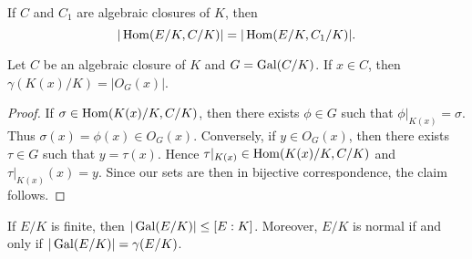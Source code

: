 \begin{exercise}
\label{xca:gamma_C}
    If $C$ and $C_1$ are algebraic closures of $K$, then
    \[
    |\operatorname{Hom}(E/K,C/K)|=|\operatorname{Hom}(E/K,C_1/K)|.
    \]
\end{exercise}

\begin{proposition}
\label{pro:gamma_orbit}
    Let $C$ be an algebraic closure of $K$ and $G=\operatorname{Gal}(C/K)$. 
    If $x\in C$, then $\gamma(K(x)/K)=|O_G(x)|$. 
\end{proposition}

\begin{proof}
    If $\sigma\in\operatorname{Hom}(K(x)/K,C/K)$, then there exists $\phi\in G$ such that
    $\phi|_{K(x)}=\sigma$. Thus $\sigma(x)=\phi(x)\in O_G(x)$. Conversely,
    if $y\in O_G(x)$, then there exists $\tau\in G$ such that
    $y=\tau(x)$. Hence $\tau|_{K(x)}\in\operatorname{Hom}(K(x)/K,C/K)$ and 
    $\tau|_{K(x)}(x)=y$. Since our sets are then in bijective correspondence, 
    the claim follows. 
\end{proof}


\begin{exercise}
If $E/K$ is finite, then $|\operatorname{Gal}(E/K)|\leq [E:K]$. Moreover, 
$E/K$ is normal if and only if $|\operatorname{Gal}(E/K)|=\gamma(E/K)$. 
\end{exercise}

